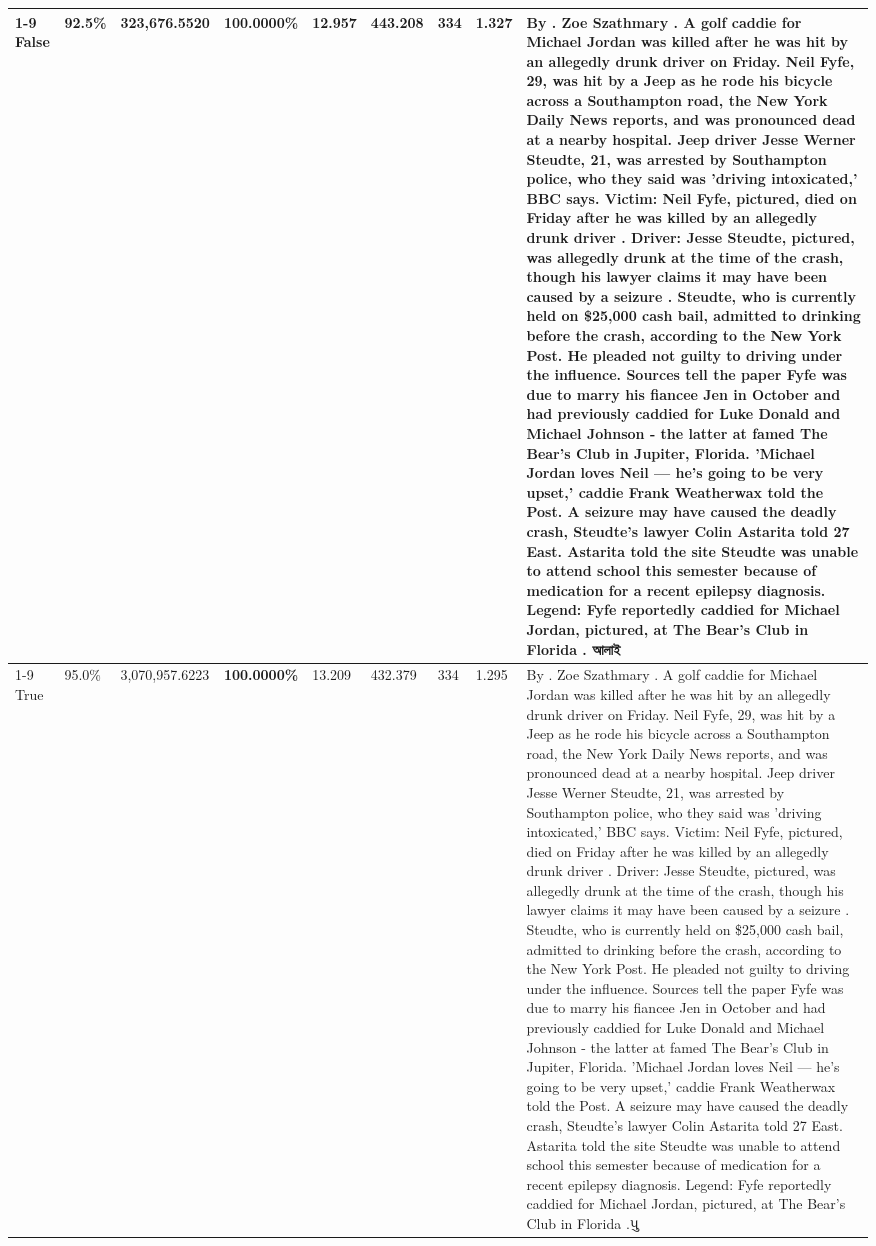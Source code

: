 \begin{table}[H]
\begin{tabular}{lllrlllll}
\cline{1-9}
False & 92.5\% & 323,676.5520 & \bfseries \color{red} 100.0000\% & 12.957 & 443.208 & 334 & 1.327 & By . Zoe Szathmary . A golf caddie for Michael Jordan was killed after he was hit by an allegedly drunk driver on Friday. Neil Fyfe, 29, was hit by a Jeep as he rode his bicycle across a Southampton road, the New York Daily News reports, and was pronounced dead at a nearby hospital. Jeep driver Jesse Werner Steudte, 21, was arrested by Southampton police, who they said was 'driving intoxicated,' BBC says. Victim: Neil Fyfe, pictured, died on Friday after he was killed by an allegedly drunk driver . Driver: Jesse Steudte, pictured, was allegedly drunk at the time of the crash, though his lawyer claims it may have been caused by a seizure . Steudte, who is currently held on \$25,000 cash bail, admitted to drinking before the crash, according to the New York Post. He pleaded not guilty to driving under the influence. Sources tell the paper Fyfe was due to marry his fiancee Jen in October and had previously caddied for Luke Donald and Michael Johnson - the latter at famed The Bear's Club in Jupiter, Florida. 'Michael Jordan loves Neil — he’s going to be very upset,' caddie Frank Weatherwax told the Post. A seizure may have caused the deadly crash, Steudte's lawyer Colin Astarita told 27 East. Astarita told the site Steudte was unable to attend school this semester because of medication for a recent epilepsy diagnosis. Legend: Fyfe reportedly caddied for Michael Jordan, pictured, at The Bear's Club in Florida . আলাই \\
\cline{1-9}
True & 95.0\% & 3,070,957.6223 & \bfseries \color{red} 100.0000\% & 13.209 & 432.379 & 334 & 1.295 & By . Zoe Szathmary . A golf caddie for Michael Jordan was killed after he was hit by an allegedly drunk driver on Friday. Neil Fyfe, 29, was hit by a Jeep as he rode his bicycle across a Southampton road, the New York Daily News reports, and was pronounced dead at a nearby hospital. Jeep driver Jesse Werner Steudte, 21, was arrested by Southampton police, who they said was 'driving intoxicated,' BBC says. Victim: Neil Fyfe, pictured, died on Friday after he was killed by an allegedly drunk driver . Driver: Jesse Steudte, pictured, was allegedly drunk at the time of the crash, though his lawyer claims it may have been caused by a seizure . Steudte, who is currently held on \$25,000 cash bail, admitted to drinking before the crash, according to the New York Post. He pleaded not guilty to driving under the influence. Sources tell the paper Fyfe was due to marry his fiancee Jen in October and had previously caddied for Luke Donald and Michael Johnson - the latter at famed The Bear's Club in Jupiter, Florida. 'Michael Jordan loves Neil — he’s going to be very upset,' caddie Frank Weatherwax told the Post. A seizure may have caused the deadly crash, Steudte's lawyer Colin Astarita told 27 East. Astarita told the site Steudte was unable to attend school this semester because of medication for a recent epilepsy diagnosis. Legend: Fyfe reportedly caddied for Michael Jordan, pictured, at The Bear's Club in Florida .પુ \\

\end{tabular}
\end{table}
